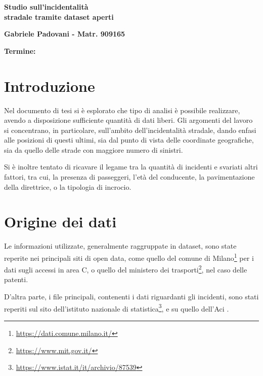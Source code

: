 \documentclass[a4paper]{article}
\begin{document}
    \begin{center}
    {\huge{\bf Studio sull'incidentalità}}\\
    \vspace{3mm}
    {\huge{\bf stradale tramite dataset aperti}}\\
    \end{center}
    \vspace{3mm}
    \begin{center}
    {\bf Gabriele Padovani - Matr. 909165}\\
    \end{center}
    \vspace{2mm}
    \begin{center}
    {\bf Termine:}\\
    \end{center}

\section{Introduzione}

Nel documento di tesi si è esplorato che tipo di analisi è possibile realizzare, 
avendo a disposizione sufficiente quantità di dati liberi. 
Gli argomenti del lavoro si concentrano, in particolare, sull'ambito dell'incidentalità 
stradale, dando enfasi alle posizioni di questi ultimi, sia dal punto di vista delle coordinate 
geografiche, sia da quello delle strade con maggiore numero di sinistri. 

Si è inoltre tentato di ricavare il legame tra la quantità di incidenti e svariati altri 
fattori, tra cui, la presenza di passeggeri, l'età del conducente, 
la pavimentazione della direttrice, o la tipologia di incrocio.

\section{Origine dei dati}

Le informazioni utilizzate, generalmente raggruppate in dataset, sono 
state reperite nei principali siti di open data, come quello del comune di 
Milano\footnote{\url{https://dati.comune.milano.it/}} per i dati sugli accessi in area C, 
o quello del ministero dei trasporti\footnote{\url{https://www.mit.gov.it/}}, 
nel caso delle patenti.

D'altra parte, i file principali, contenenti i dati riguardanti gli incidenti, sono 
stati reperiti sul sito 
dell'istituto nazionale di statistica\footnote{\url{https://www.istat.it/it/archivio/87539}}, 
e su quello dell'Aci \cite{ACI:1}. 
\end{document}
